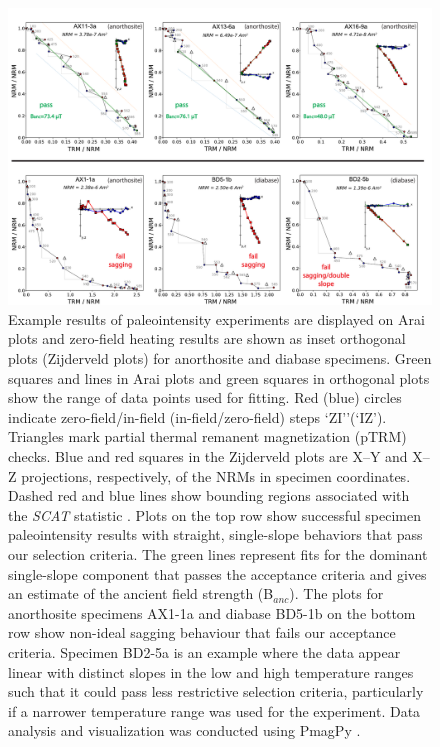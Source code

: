 \begin{figure}
\noindent\includegraphics[width=\textwidth]{figure/Zhang2022/IZZI_examples.pdf}
\centering
\caption{\footnotesize{Example results of paleointensity experiments are displayed on Arai plots and zero-field heating results are shown as inset orthogonal plots (Zijderveld plots) for anorthosite and diabase specimens. Green squares and lines in Arai plots and green squares in orthogonal plots show the range of data points used for fitting. Red (blue) circles indicate zero-field/in-field (in-field/zero-field) steps `ZI’'(`IZ'). Triangles mark partial thermal remanent magnetization (pTRM) checks. Blue and red squares in the Zijderveld plots are X–Y and X–Z projections, respectively, of the NRMs in specimen coordinates. Dashed red and blue lines show bounding regions associated with the \textit{SCAT} statistic \citep{Shaar2013a}. Plots on the top row show successful specimen paleointensity results with straight, single-slope behaviors that pass our selection criteria. The green lines represent fits for the dominant single-slope component that passes the acceptance criteria and gives an estimate of the ancient field strength (B$_{anc}$). The plots for anorthosite specimens AX1-1a and diabase BD5-1b on the bottom row show non-ideal sagging behaviour that fails our acceptance criteria. Specimen BD2-5a is an example where the data appear linear with distinct slopes in the low and high temperature ranges such that it could pass less restrictive selection criteria, particularly if a narrower temperature range was used for the experiment. Data analysis and visualization was conducted using PmagPy \citep{Tauxe2016a}.}}
\label{fig:IZZI_examples}
\end{figure}

